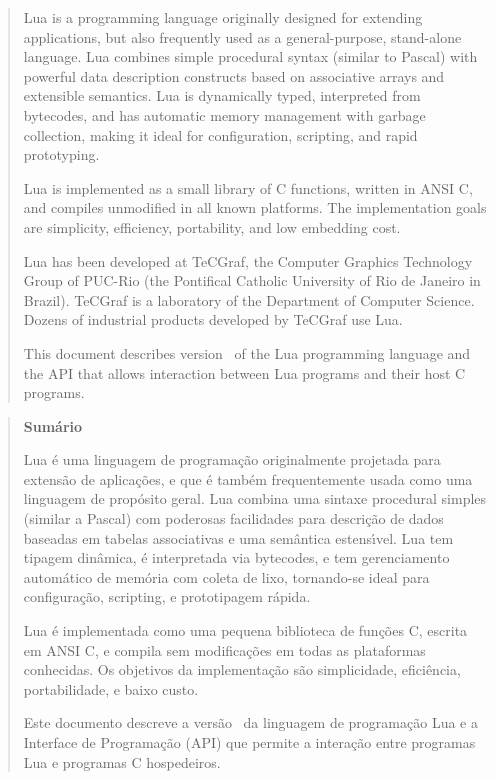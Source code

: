 \begin{abstract}
\noindent
Lua is a programming language originally designed for extending applications,
but also frequently used as a general-purpose, stand-alone language.
Lua combines simple procedural syntax (similar to Pascal)
with powerful data description constructs based on associative
arrays and extensible semantics.
Lua is dynamically typed, interpreted from bytecodes,
and has automatic memory management with garbage collection,
making it ideal for configuration, scripting, and rapid prototyping. 

Lua is implemented as a small library of C functions,
written in ANSI C, and compiles unmodified in all known platforms.
The implementation goals are simplicity, efficiency, portability,
and low embedding cost. 

Lua has been developed at TeCGraf,
the Computer Graphics Technology Group of PUC-Rio
(the Pontifical Catholic University of Rio de Janeiro in Brazil).
TeCGraf is a laboratory of the Department of Computer Science.
Dozens of industrial products developed by TeCGraf use Lua. 

This document describes version \Version\ of the Lua programming language
and the API that allows interaction between Lua programs and their
host C programs.
\end{abstract}
\vspace{4ex}
\begin{quotation}
\small
\begin{center}{\bf Sum\'ario}\end{center}
\vspace{1ex}
\noindent
Lua \'e uma linguagem de programa\c{c}\~ao originalmente projetada para
extens\~ao de aplica\c{c}\~oes,
e que \'e tamb\'em frequentemente usada como uma linguagem de
prop\'osito geral.
Lua combina uma sintaxe procedural simples (similar a Pascal)
com poderosas facilidades para descri\c{c}\~ao de dados baseadas
em tabelas associativas e uma sem\^antica estens\'{\i}vel. 
Lua tem tipagem din\^amica, \'e interpretada via bytecodes,
e tem gerenciamento autom\'atico de mem\'oria com coleta de lixo,
tornando-se ideal para configura\c{c}\~ao, scripting,
e prototipagem r\'apida.

Lua \'e implementada como uma pequena biblioteca de fun\c{c}\~oes C,
escrita em ANSI C, e compila sem modifica\c{c}\~oes em todas as
plataformas conhecidas.
Os objetivos da implementa\c{c}\~ao s\~ao simplicidade, efici\^encia,
portabilidade, e baixo custo.

Este documento descreve a vers\~ao \Version\ da linguagem de
programa\c{c}\~ao Lua e a Interface de Programa\c{c}\~ao (API) que permite
a intera\c{c}\~ao entre programas Lua e programas C hospedeiros.
\end{quotation}


